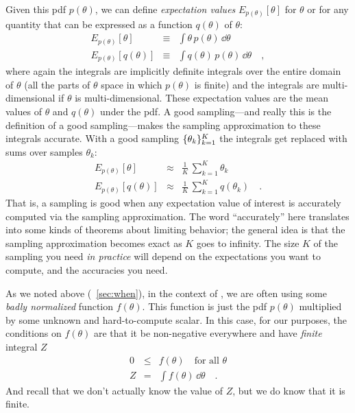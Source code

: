 \documentclass[modern]{aastex61}
\newcommand{\MCMC}{\acronym{MCMC}}
\newcommand{\pars}{\theta}
\begin{document}
Given this pdf $p(\pars)$, we can define \emph{expectation values}
$E_{p(\pars)}[\pars]$
for $\pars$ or for any quantity that can be expressed as a function $q(\pars)$
of $\pars$:
\begin{eqnarray}
E_{p(\pars)}[\pars] &\equiv& \int \pars\,p(\pars)\,\dd \pars
\\
E_{p(\pars)}[q(\pars)] &\equiv& \int q(\pars)\,p(\pars)\,\dd \pars
\quad ,
\end{eqnarray}
where again the integrals are implicitly definite integrals over the
entire domain
of $\pars$ (all the parts of $\pars$ space in which $p(\pars)$ is finite) and the
integrals are multi-dimensional if $\pars$ is multi-dimensional.
These expectation values are the mean values of $\pars$ and $q(\pars)$ under
the pdf.  A good sampling---and really this is the definition of a good
sampling---makes the sampling approximation to these integrals
accurate.
With a good sampling $\setof{\pars_k}_{k=1}^K$ the integrals get replaced
with sums over samples $\pars_k$:
\begin{eqnarray}
E_{p(\pars)}[\pars] &\approx& \frac{1}{K}\,\sum_{k=1}^K \pars_k
\\
E_{p(\pars)}[q(\pars)] &\approx& \frac{1}{K}\,\sum_{k=1}^K q(\pars_k)
\quad .
\end{eqnarray}
That is, a sampling is good when any expectation value of interest is
accurately computed via the sampling approximation.
The word ``accurately'' here translates into some kinds of theorems
about limiting behavior; the general idea is that the sampling
approximation becomes exact as $K$ goes to infinity.
The size $K$ of the sampling you need \emph{in practice} will depend
on the expectations you want to compute, and the accuracies you need.

As we noted above (\sectionname~\ref{sec:when}), in the context of \MCMC, we are often
using some \emph{badly normalized} function $f(\pars)$.
This function is just the pdf $p(\pars)$ multiplied by some unknown and
hard-to-compute scalar.
In this case, for our purposes, the conditions on $f(\pars)$ are that it
be non-negative everywhere and have \emph{finite} integral $Z$
\begin{eqnarray}
0 &\leq& f(\pars) \quad \mbox{for all $\pars$}
\\
Z &=& \int f(\pars)\,\dd \pars \label{eq:proper}
\quad .
\end{eqnarray}
And recall that we don't actually know the value of $Z$, but we do know
that it is finite.
\end{document}
